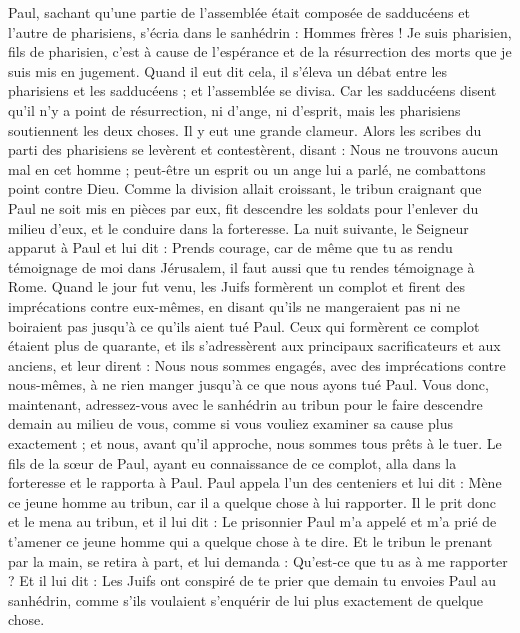\begin{multicols}{2}
Paul, sachant qu'une partie de l’assemblée était composée de sadducéens et l'autre de pharisiens, s'écria dans le sanhédrin : Hommes frères ! Je suis pharisien, fils de pharisien, c’est à cause de l’espérance et de la résurrection des morts que je suis mis en jugement.
Quand il eut dit cela, il s’éleva un débat entre les pharisiens et les sadducéens ; et l'assemblée se divisa.
Car les sadducéens disent qu'il n'y a point de résurrection, ni d'ange, ni d'esprit, mais les pharisiens soutiennent les deux choses.
Il y eut une grande clameur. Alors les scribes du parti des pharisiens se levèrent et contestèrent, disant : Nous ne trouvons aucun mal en cet homme ; peut-être un esprit ou un ange lui a parlé, ne combattons point contre Dieu.
Comme la division allait croissant, le tribun craignant que Paul ne soit mis en pièces par eux, fit descendre les soldats pour l’enlever du milieu d'eux, et le conduire dans la forteresse.
La nuit suivante, le Seigneur apparut à Paul et lui dit : Prends courage, car de même que tu as rendu témoignage de moi dans Jérusalem, il faut aussi que tu rendes témoignage à Rome.
Quand le jour fut venu, les Juifs formèrent un complot et firent des imprécations contre eux-mêmes, en disant qu'ils ne mangeraient pas ni ne boiraient pas jusqu'à ce qu'ils aient tué Paul.
Ceux qui formèrent ce complot étaient plus de quarante,
et ils s'adressèrent aux principaux sacrificateurs et aux anciens, et leur dirent : Nous nous sommes engagés, avec des imprécations contre nous-mêmes, à ne rien manger jusqu’à ce que nous ayons tué Paul.
Vous donc, maintenant, adressez-vous avec le sanhédrin au tribun pour le faire descendre demain au milieu de vous, comme si vous vouliez examiner sa cause plus exactement ; et nous, avant qu'il approche, nous sommes tous prêts à le tuer.
Le fils de la sœur de Paul, ayant eu connaissance de ce complot, alla dans la forteresse et le rapporta à Paul.
Paul appela l’un des centeniers et lui dit : Mène ce jeune homme au tribun, car il a quelque chose à lui rapporter.
Il le prit donc et le mena au tribun, et il lui dit : Le prisonnier Paul m'a appelé et m'a prié de t'amener ce jeune homme qui a quelque chose à te dire.
Et le tribun le prenant par la main, se retira à part, et lui demanda : Qu'est-ce que tu as à me rapporter ?
Et il lui dit : Les Juifs ont conspiré de te prier que demain tu envoies Paul au sanhédrin, comme s'ils voulaient s'enquérir de lui plus exactement de quelque chose.

\end{multicols}

